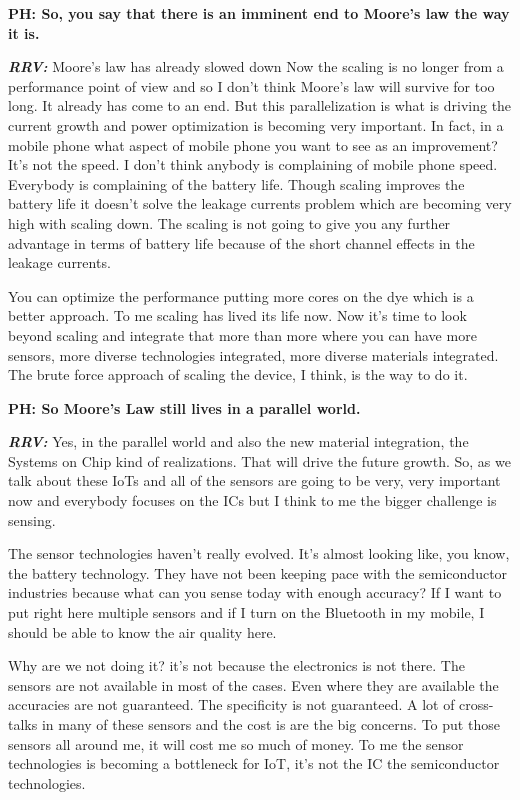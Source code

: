 \begin{multicols}{2}
\textbf{PH:  So, you say that there is an imminent end to Moore’s law the way it is.}

\textbf{\textit{RRV:}} Moore’s law has already slowed down Now the scaling is no longer from a performance point of view and so I don’t think Moore’s law will survive for too long. It already has come to an end. But this parallelization is what is driving the current growth and power optimization is becoming very important. In fact, in a mobile phone what aspect of mobile phone you want to see as an improvement? It’s not the speed. I don’t think anybody is complaining of mobile phone speed. Everybody is complaining of the battery life. Though scaling improves the battery life it doesn’t solve the leakage currents problem which are becoming very high with scaling down. The scaling is not going to give you any further advantage in terms of battery life because of the short channel effects in the leakage currents. 

You can optimize the performance putting more cores on the dye which is a better approach. To me scaling has lived its life now. Now it’s time to look beyond scaling and integrate that more than more where you can have more sensors, more diverse technologies integrated, more diverse materials integrated. The brute force approach of scaling the device, I think, is the way to do it.

\textbf{PH: So Moore’s Law still lives in a parallel world.} 

\textbf{\textit{RRV:}} Yes, in the parallel world and also the new material integration, the Systems on Chip kind of realizations. That will drive the future growth. So, as we talk about these IoTs and all of the sensors are going to be very, very important now and everybody focuses on the ICs but I think to me the bigger challenge is sensing.

The sensor technologies haven’t really evolved. It’s almost looking like, you know, the battery technology. They have not been keeping pace with the semiconductor industries because what can you sense today with enough accuracy? If I want to put right here multiple sensors and if I turn on the Bluetooth in my mobile, I should be able to know the air quality here.

Why are we not doing it? it’s not because the electronics is not there. The sensors are not available in most of the cases. Even where they are available the accuracies are not guaranteed. The specificity is not guaranteed. A lot of cross-talks in many of these sensors and the cost is are the big concerns. To put those sensors all around me, it will cost me so much of money. To me the sensor technologies is becoming a bottleneck for IoT, it’s not the IC the semiconductor technologies.


\end{multicols}
